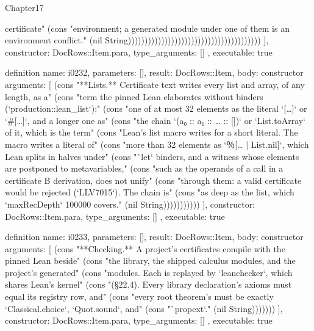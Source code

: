 \begin{lexlean}{Chapter17}
\begin{semanticmodule}
{{certificate" (cons "environment; a generated module under one of them is an environment conflict." (nil String))))))))))))))))))))))))))))))))))))))))
    ],
    constructor: DocRows::Item.para,
    type_arguments: []
  },
  executable: true
}

definition{
  name: i0232,
  parameters: [],
  result: DocRows::Item,
  body: constructor{
    arguments: [
      (cons "**Lists.** Certificate text writes every list and array, of any length, as a" (cons "term the pinned Lean elaborates without binders (`production::lean_list`):" (cons "one of at most 32 elements as the literal `[…]` or `#[…]`, and a longer one as" (cons "the chain `(a₀ :: a₁ :: … :: [])` or `List.toArray` of it, which is the term" (cons "Lean's list macro writes for a short literal. The macro writes a literal of" (cons "more than 32 elements as `％[… | List.nil]`, which Lean splits in halves under" (cons "`let` binders, and a witness whose elements are postponed to metavariables," (cons "such as the operands of a call in a certificate B derivation, does not unify" (cons "through them: a valid certificate would be rejected (`LLV7015`). The chain is" (cons "as deep as the list, which `maxRecDepth` 100000 covers." (nil String)))))))))))
    ],
    constructor: DocRows::Item.para,
    type_arguments: []
  },
  executable: true
}

definition{
  name: i0233,
  parameters: [],
  result: DocRows::Item,
  body: constructor{
    arguments: [
      (cons "**Checking.** A project's certificates compile with the pinned Lean beside" (cons "the library, the shipped calculus modules, and the project's generated" (cons "modules. Each is replayed by `leanchecker`, which shares Lean's kernel" (cons "(§22.4). Every library declaration's axioms must equal its registry row, and" (cons "every root theorem's must be exactly `Classical.choice`, `Quot.sound`, and" (cons "`propext`." (nil String)))))))
    ],
    constructor: DocRows::Item.para,
    type_arguments: []
  },
  executable: true
}


\end{semanticmodule}
\end{lexlean}
